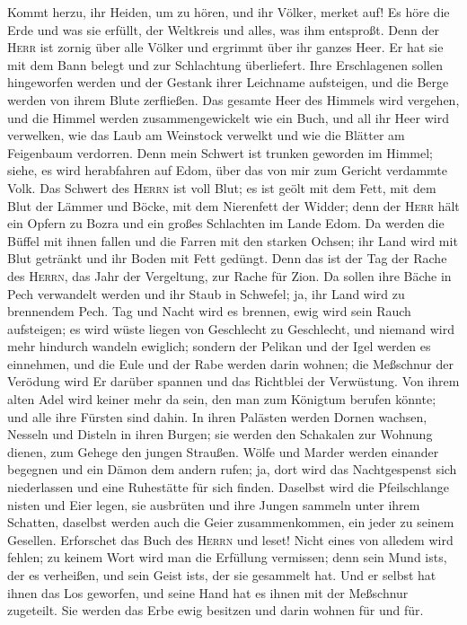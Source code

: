  Kommt herzu, ihr Heiden, um zu hören, und ihr Völker,
merket auf! Es höre die Erde und was sie erfüllt, der Weltkreis und
alles, was ihm entsproßt.  Denn der \textsc{Herr} ist
zornig über alle Völker und ergrimmt über ihr ganzes Heer. Er hat sie
mit dem Bann belegt und zur Schlachtung überliefert.  Ihre
Erschlagenen sollen hingeworfen werden und der Gestank ihrer Leichname
aufsteigen, und die Berge werden von ihrem Blute zerfließen.
 Das gesamte Heer des Himmels wird vergehen, und die
Himmel werden zusammengewickelt wie ein Buch, und all ihr Heer wird
verwelken, wie das Laub am Weinstock verwelkt und wie die Blätter am
Feigenbaum verdorren.  Denn mein Schwert ist trunken
geworden im Himmel; siehe, es wird herabfahren auf Edom, über das von
mir zum Gericht verdammte Volk.  Das Schwert des
\textsc{Herrn} ist voll Blut; es ist geölt mit dem Fett, mit dem Blut
der Lämmer und Böcke, mit dem Nierenfett der Widder; denn der
\textsc{Herr} hält ein Opfern zu Bozra und ein großes Schlachten im
Lande Edom.  Da werden die Büffel mit ihnen fallen und die
Farren mit den starken Ochsen; ihr Land wird mit Blut getränkt und ihr
Boden mit Fett gedüngt.  Denn das ist der Tag der Rache
des \textsc{Herrn}, das Jahr der Vergeltung, zur Rache für Zion.
 Da sollen ihre Bäche in Pech verwandelt werden und ihr
Staub in Schwefel; ja, ihr Land wird zu brennendem Pech. 
Tag und Nacht wird es brennen, ewig wird sein Rauch aufsteigen; es wird
wüste liegen von Geschlecht zu Geschlecht, und niemand wird mehr
hindurch wandeln ewiglich;  sondern der Pelikan und der
Igel werden es einnehmen, und die Eule und der Rabe werden darin wohnen;
die Meßschnur der Verödung wird Er darüber spannen und das Richtblei der
Verwüstung.  Von ihrem alten Adel wird keiner mehr da
sein, den man zum Königtum berufen könnte; und alle ihre Fürsten sind
dahin.  In ihren Palästen werden Dornen wachsen, Nesseln
und Disteln in ihren Burgen; sie werden den Schakalen zur Wohnung
dienen, zum Gehege den jungen Straußen.  Wölfe und Marder
werden einander begegnen und ein Dämon dem andern rufen; ja, dort wird
das Nachtgespenst sich niederlassen und eine Ruhestätte für sich finden.
 Daselbst wird die Pfeilschlange nisten und Eier legen,
sie ausbrüten und ihre Jungen sammeln unter ihrem Schatten, daselbst
werden auch die Geier zusammenkommen, ein jeder zu seinem Gesellen.
 Erforschet das Buch des \textsc{Herrn} und leset! Nicht
eines von alledem wird fehlen; zu keinem Wort wird man die Erfüllung
vermissen; denn sein Mund ist\textquotesingle s, der es verheißen, und
sein Geist ist\textquotesingle s, der sie gesammelt hat. 
Und er selbst hat ihnen das Los geworfen, und seine Hand hat es ihnen
mit der Meßschnur zugeteilt. Sie werden das Erbe ewig besitzen und darin
wohnen für und für.

